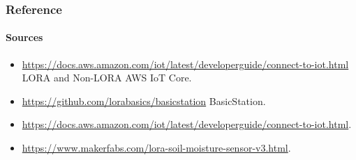 \documentclass{beamer}
\begin{document}
\begin{frame}[t]
  \frametitle{Reference }
  \framesubtitle{Sources}
 \begin{itemize}
    \item \url{https://docs.aws.amazon.com/iot/latest/developerguide/connect-to-iot.html} {LORA and Non-LORA AWS IoT Core}.
    \item \url{https://github.com/lorabasics/basicstation} {BasicStation}.
    \item \url{https://docs.aws.amazon.com/iot/latest/developerguide/connect-to-iot.html}.
    \item \url{https://www.makerfabs.com/lora-soil-moisture-sensor-v3.html}.
 \end{itemize}
\end{frame}
\end{document}
